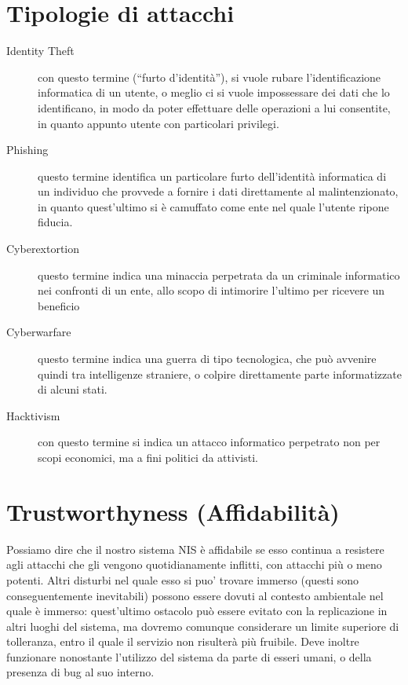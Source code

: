\section{Tipologie di attacchi}
\begin{description}
	\item[Identity Theft] con questo termine (``furto d'identità''), si
				vuole rubare l'identificazione informatica
				di un utente, o meglio ci si vuole impossessare
				dei dati che lo identificano, in modo da poter
				effettuare delle operazioni a lui consentite,
				in quanto appunto utente con particolari 
				privilegi.
	\item[Phishing] questo termine identifica un particolare furto dell'identità
				informatica di un individuo che provvede 
				a fornire i dati direttamente al malintenzionato,
				in quanto quest'ultimo si è camuffato come 
				ente nel quale l'utente ripone fiducia.
	\item[Cyberextortion] questo termine indica una minaccia perpetrata da
				un criminale informatico nei confronti di un
				ente, allo scopo di intimorire l'ultimo per
				ricevere un beneficio
	\item[Cyberwarfare] questo termine indica una guerra di tipo 
				tecnologica, che può avvenire quindi tra 
				intelligenze straniere, o colpire direttamente
				parte informatizzate di alcuni stati.
	\item[Hacktivism] con questo termine si indica un attacco informatico
				perpetrato non per scopi economici, ma a fini
				politici da attivisti.
\end{description}

\section{Trustworthyness (Affidabilità)}
Possiamo dire che il nostro sistema NIS è affidabile se esso continua a
resistere agli attacchi che gli vengono quotidianamente inflitti, con 
attacchi più o meno potenti. Altri disturbi nel quale esso si puo' trovare
immerso (questi sono conseguentemente inevitabili) possono
essere dovuti al contesto ambientale nel quale è immerso: quest'ultimo
ostacolo può essere evitato con la replicazione in altri luoghi del sistema,
ma dovremo comunque considerare un limite superiore di tolleranza, entro il
quale il servizio non risulterà più fruibile. Deve inoltre funzionare 
nonostante l'utilizzo del sistema da parte di esseri umani, o della presenza
di bug al suo interno.


